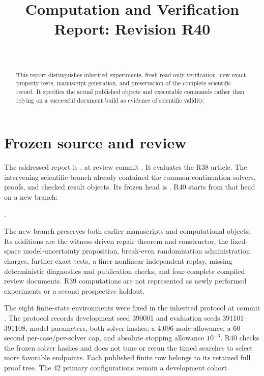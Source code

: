 


\begin{frontmatter}
\title{Computation and Verification Report: Revision R40}
\begin{aug}\author[id=au1,addressref={add1}]{~}\address[id=add1]{}\end{aug}
\begin{abstract}This report distinguishes inherited experiments, fresh read-only verification, new exact property tests, manuscript generation, and preservation of the complete scientific record. It specifies the actual published objects and executable commands rather than relying on a successful document build as evidence of scientific validity.\end{abstract}
\end{frontmatter}

\section{Frozen source and review}
The addressed report is , at review commit . It evaluates the R38 article. The intervening scientific branch already contained the common-continuation solvers, proofs, and checked result objects. Its frozen head is . R40 starts from that head on a new branch:
\begin{center}.\end{center}
The new branch preserves both earlier manuscripts and computational objects. Its additions are the witness-driven repair theorem and constructor, the fixed-space model-uncertainty proposition, break-even randomization administration charges, further exact tests, a finer nonlinear independent replay, missing deterministic diagnostics and publication checks, and four complete compiled review documents. R39 computations are not represented as newly performed experiments or a second prospective holdout.

The eight finite-state environments were fixed in the inherited protocol at commit . The protocol records development seed 390001 and evaluation seeds 391101--391108, model parameters, both solver hashes, a 4,096-node allowance, a 60-second per-case/per-solver cap, and absolute stopping allowance $10^{-3}$. R40 checks the frozen solver hashes and does not tune or rerun the timed searches to select more favorable endpoints. Each published finite row belongs to its retained full proof tree. The 42 primary configurations remain a development cohort.

